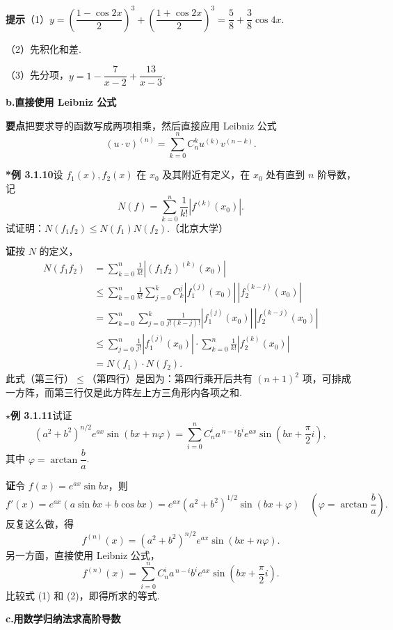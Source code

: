 \documentclass[UTF8, 12pt, fontset=fandol, oneside]{ctexart}
\begin{document}
\noindent\textbf{提示}\quad （1）$y=\left(\dfrac{1-\cos2x}{2}\right)^3+\left(\dfrac{1+\cos2x}{2}\right)^3=\dfrac58+\dfrac38\cos4x$.

（2）先积化和差.

（3）先分项，$y=1-\dfrac7{x-2}+\dfrac{13}{x-3}$.

\noindent\textbf{b.\quad 直接使用 Leibniz 公式}

\noindent\textbf{要点}\quad 把要求导的函数写成两项相乘，然后直接应用 Leibniz 公式
\[
  (u\cdot v)^{(n)}=\sum_{k=0}^n C_n^k u^{(k)}v^{(n-k)}.
\]

\noindent\textbf{*例 3.1.10}\quad 设 $f_1(x),f_2(x)$ 在 $x_0$ 及其附近有定义，在 $x_0$ 处有直到 $n$ 阶导数，记
\[
  N(f)=\sum_{k=0}^n\frac1{k!}|f^{(k)}(x_0)|.
\]
试证明：$N(f_1f_2)\le N(f_1)N(f_2)$.（北京大学）

\noindent\textbf{证}\quad 按 $N$ 的定义，
\[
\begin{aligned}
N(f_1f_2)
&=\sum_{k=0}^n\frac1{k!}|(f_1f_2)^{(k)}(x_0)|\\
&\le\sum_{k=0}^n\frac1{k!}\sum_{j=0}^k C_k^j
|f_1^{(j)}(x_0)|\,|f_2^{(k-j)}(x_0)|\\
&=\sum_{k=0}^n\sum_{j=0}^k
\frac1{j!(k-j)!}|f_1^{(j)}(x_0)|\,|f_2^{(k-j)}(x_0)|\\
&\le\sum_{j=0}^n\frac1{j!}|f_1^{(j)}(x_0)|
\cdot\sum_{k=0}^n\frac1{k!}|f_2^{(k)}(x_0)|\\
&=N(f_1)\cdot N(f_2).
\end{aligned}
\]
此式（第三行）$\le$（第四行）是因为：第四行乘开后共有 $(n+1)^2$ 项，可排成一方阵，而第三行仅是此方阵左上方三角形内各项之和.

\noindent\textbf{$\star$例 3.1.11}\quad 试证
\[
  (a^2+b^2)^{n/2}e^{ax}\sin(bx+n\varphi)
  =\sum_{i=0}^n C_n^i a^{\,n-i}b^i e^{ax}\sin\left(bx+\frac\pi2 i\right),
\]
其中 $\varphi=\arctan\dfrac ba$.

\noindent\textbf{证}\quad 令 $f(x)=e^{ax}\sin bx$，则
\[
  f'(x)=e^{ax}(a\sin bx+b\cos bx)
  =e^{ax}(a^2+b^2)^{1/2}\sin(bx+\varphi)
  \quad\left(\varphi=\arctan\frac ba\right).
\]
反复这么做，得
\begin{equation}
  f^{(n)}(x)=(a^2+b^2)^{n/2}e^{ax}\sin(bx+n\varphi).
\tag{1}
\end{equation}
另一方面，直接使用 Leibniz 公式，
\begin{equation}
  f^{(n)}(x)=\sum_{i=0}^n C_n^i a^{\,n-i}b^i e^{ax}\sin\left(bx+\frac\pi2 i\right).
\tag{2}
\end{equation}
比较式 (1) 和 (2)，即得所求的等式.

\noindent\textbf{c.\quad 用数学归纳法求高阶导数}
\end{document}
